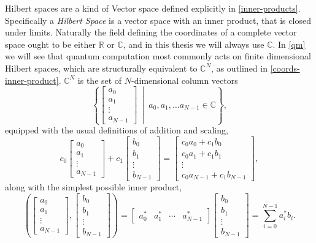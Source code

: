 Hilbert spaces are a kind of Vector space defined explicitly in \autoref{inner-products}. Specifically a \emph{Hilbert Space} is a vector space with an inner product, that is closed under limits. Naturally the field defining the coordinates of a complete vector space ought to be either $\mathbb{R}$ or $\mathbb{C}$, and in this thesis we will always use $\mathbb{C}$. In \autoref{qm} we will see that quantum computation most commonly acts on finite dimensional Hilbert spaces, which are structurally equivalent to $\mathbb{C}^N$, as outlined in \autoref{coords-inner-product}. $\mathbb{C}^N$ is the set of $N$-dimensional column vectors
\[\left\{\left[\begin{matrix} a_0\\a_1\\\vdots\\a_{N-1}\end{matrix}\right]\ \middle|\ a_0, a_1, \dots a_{N-1} \in \mathbb{C}\right\},\]
equipped with the usual definitions of addition and scaling,
\[
c_0\left[\begin{matrix} a_0\\a_1\\\vdots\\a_{N-1}\end{matrix}\right]
+
c_1\left[\begin{matrix} b_0\\b_1\\\vdots\\b_{N-1}\end{matrix}\right]
=
\left[\begin{matrix} c_0a_0+c_1b_0\\c_0a_1+c_1b_1\\\vdots\\c_0a_{N-1}+c_1b_{N-1}\end{matrix}\right],
\]
along with the simplest possible inner product,
\[
\left(
\left[\begin{matrix} a_0\\a_1\\\vdots\\a_{N-1}\end{matrix}\right]
,
\left[\begin{matrix} b_0\\b_1\\\vdots\\b_{N-1}\end{matrix}\right]
\right)
=
\left[\begin{matrix} a_0^*&a_1^*&\cdots&a_{N-1}^*\end{matrix}\right]
\left[\begin{matrix} b_0\\b_1\\\vdots\\b_{N-1}\end{matrix}\right]
= \sum_{i=0}^{N-1} a_i^*b_i.
\]

